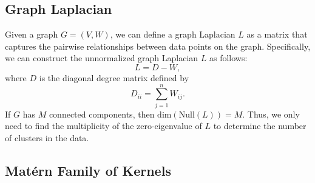 \documentclass[12pt]{amsart}
\begin{document}
\subsection{Graph Laplacian}
Given a graph $G = (V, W)$, we can define a graph Laplacian $L$ as a matrix that captures the pairwise relationships between data points on the graph. Specifically, we can construct the unnormalized graph Laplacian $L$ as follows:
$$ L = D - W, $$
where $D$ is the diagonal degree matrix defined by
\[D_{ii} = \sum_{j = 1}^n W_{ij}.\]
If $G$ has $M$ connected components, then $\mathrm{dim}(\mathrm{Null}(L))=M$. Thus, we only need to find the multiplicity of the zero-eigenvalue of $L$ to determine the number of clusters in the data.

\subsection{Mat\'{e}rn Family of Kernels}
\end{document}
